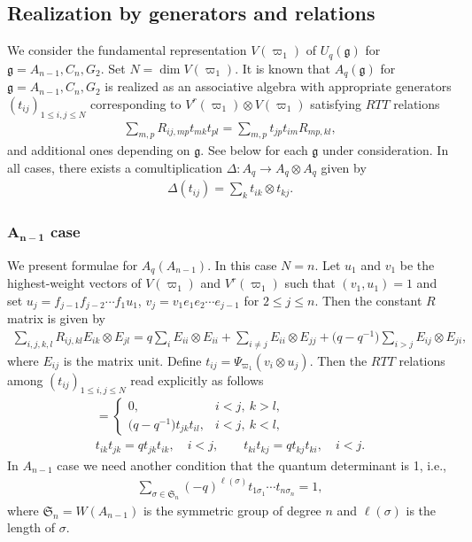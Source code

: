 \documentclass[pdftex]{sigma}
\newcommand{\geh}{\mathfrak{g}}
\newcommand{\ot}{\otimes}
\begin{document}
\subsection{Realization by generators and relations}

We consider the fundamental representation $V(\varpi_1)$ of $U_q(\geh)$ for $\geh=A_{n-1},C_n,G_2$.
Set $N=\dim V(\varpi_1)$. It is known \cite{D86,RTF} that $A_q(\geh)$ for $\geh=A_{n-1},C_n,G_2$ is
realized as an associative algebra with appropriate generators $(t_{ij})_{1\le i,j \le N}$
corresponding to $V^r(\varpi_1)\ot V(\varpi_1)$ satisfying $RTT$ relations
\begin{gather}\label{a:rtt}
 \sum_{m,p}R_{ij,mp}t_{mk}t_{pl}
= \sum_{m,p}t_{jp}t_{im}R_{mp,kl},
\end{gather}
and additional ones depending on $\geh$.
See below for each $\geh$ under consideration.
In all cases, there exists a comultiplication $\Delta: A_q \rightarrow A_q \otimes A_q$ given by
\begin{gather}\label{a:cpro}
\Delta(t_{ij}) = \sum_k t_{ik}\otimes t_{kj}.
\end{gather}

\subsubsection[$A_{n-1}$ case]{$\boldsymbol{A_{n-1}}$ case}\label{a:sss:a1}

We present formulae for $A_q(A_{n-1})$. In this case $N=n$.
Let $u_1$ and $v_1$ be the highest-weight vectors of
$V(\varpi_1)$ and $V^r(\varpi_1)$ such that $(v_1,u_1)=1$ and
set $u_j=f_{j-1}f_{j-2}\cdots f_1u_1$, $v_j=v_1e_1e_2\cdots e_{j-1}$
for $2\le j\le n$. Then the constant $R$ matrix is given by
\begin{gather*}
\sum_{i,j,k,l}R_{ij,kl}E_{ik}\otimes E_{jl}=
q\sum_i E_{ii}\otimes E_{ii} + \sum_{i\neq j}E_{ii}\otimes E_{jj}
+\big(q-q^{-1}\big)\sum_{i>j}E_{ij}\otimes E_{ji},
\end{gather*}
where $E_{ij}$ is the matrix unit. Def\/ine $t_{ij}=\Psi_{\varpi_1}(v_i \otimes u_j)$.
Then the $RTT$ relations among $(t_{ij})_{1\le i,j\le N}$ read explicitly as follows
\begin{gather*}
 [t_{ik}, t_{jl}]=\begin{cases}0, & i<j, \ k>l,\\
\big(q-q^{-1}\big)t_{jk}t_{il}, &  i<j, \ k<l,
\end{cases}\\
 t_{ik}t_{jk} = q t_{jk}t_{ik},\quad i<j,\qquad
t_{ki}t_{kj} = q t_{kj}t_{ki},\quad i<j.
\end{gather*}
In $A_{n-1}$ case we need another condition that the quantum determinant is 1, i.e.,
\begin{gather*}
\sum_{\sigma \in \mathfrak{S}_n}(-q)^{\ell(\sigma)}
t_{1\sigma_1}\cdots t_{n\sigma_n} = 1,
\end{gather*}
where $\mathfrak{S}_n=W(A_{n-1})$ is the symmetric group of degree $n$ and
$\ell(\sigma)$ is the length of $\sigma$.
\end{document}
